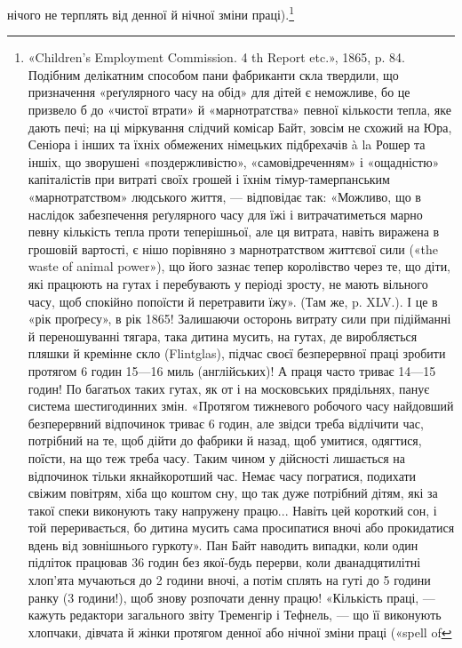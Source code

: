 нічого не терплять від денної й нічної зміни праці).\footnote{
«Children’s Employment Commission. 4 th Report etc.», 1865,
p. 84. Подібним делікатним способом пани фабриканти скла твердили, що
призначення «реґулярного часу на обід» для дітей є неможливе, бо це
призвело б до «чистої втрати» й «марнотратства» певної кількости тепла,
яке дають печі; на ці міркування слідчий комісар Байт, зовсім не схожий
на Юра, Сеніора і інших та їхніх обмежених німецьких підбрехачів à la
Рошер та іншіх, що зворушені «поздержливістю», «самовідреченням» і
«ощадністю» капіталістів при витраті своїх грошей і їхнім тімур-тамерпанським
«марнотратством» людського життя, — відповідає так: «Можливо,
що в наслідок забезпечення реґулярного часу для їжі і витрачатиметься
марно певну кількість тепла проти теперішньої, але ця витрата,
навіть виражена в грошовій вартості, є нішо порівняно з марнотратством
життєвої сили («the waste of animal power»), що його зазнає тепер королівство
через те, що діти, які працюють на гутах і перебувають у періоді
зросту, не мають вільного часу, щоб спокійно попоїсти й перетравити
їжу». (Там же, p. XLV.). І це в «рік проґресу», в рік 1865! Залишаючи
осторонь витрату сили при підійманні й переношуванні тягара, така
дитина мусить, на гутах, де виробляється пляшки й кремінне скло (Flintglas),
підчас своєї безперервної праці зробити протягом 6 годин 15—16
миль (англійських)! А праця часто триває 14—15 годин! По багатьох
таких гутах, як от і на московських прядільнях, панує система шестигодинних
змін. «Протягом тижневого робочого часу найдовший безперервний
відпочинок триває 6 годин, але звідси треба відлічити час, потрібний на
те, щоб дійти до фабрики й назад, щоб умитися, одягтися, поїсти, на що
теж треба часу. Таким чином у дійсності лишається на відпочинок тільки
якнайкоротший час. Немає часу погратися, подихати свіжим повітрям,
хіба що коштом сну, що так дуже потрібний дітям, які за такої спеки
виконують таку напружену працю... Навіть цей короткий сон, і той переривається,
бо дитина мусить сама просипатися вночі або прокидатися вдень
від зовнішнього гуркоту». Пан Байт наводить випадки, коли один підліток
працював 36 годин без якої-будь перерви, коли дванадцятилітні хлоп’ята
мучаються до 2 години вночі, а потім сплять на гуті до 5 години ранку
(3 години!), щоб знову розпочати денну працю! «Кількість праці, — кажуть
редактори загального звіту Тременгір і Тефнель, — що її виконують
хлопчаки, дівчата й жінки протягом денної або нічної зміни праці («spell of
}
